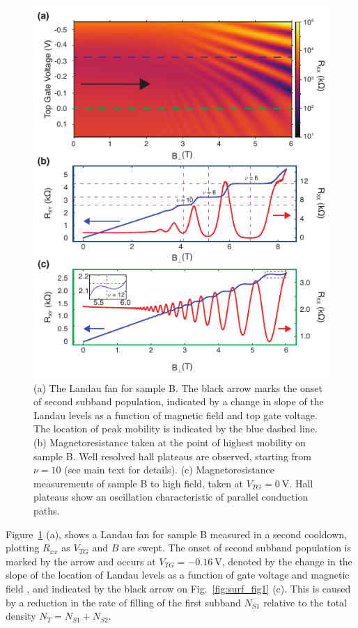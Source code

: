 \begin{figure}
    \includegraphics{Figure2}
    \caption[Magnetoresistance measurements and Landau fan for sample B]{\label{fig:surf_fig2}(a) The Landau fan for sample B. The black arrow marks the onset of second subband population, indicated by a change in slope of the Landau levels as a function of magnetic field and top gate voltage. The location of peak mobility is indicated by the blue dashed line. (b) Magnetoresistance taken at the point of highest mobility on sample B. Well resolved hall plateaus are observed, starting from $\nu = 10$ (see main text for details). (c) Magnetoresistance measurements of sample B to high field, taken at $V_{TG} = \SI{0}{\volt}$. Hall plateaus show an oscillation characteristic of parallel conduction paths. }
\end{figure}

 Figure~\ref{fig:surf_fig2} (a), shows a Landau fan for sample B measured in a second cooldown, plotting $R_{xx}$ as $V_{TG}$ and $B$ are swept.  The onset of second subband population is marked by the arrow and occurs at $V_{TG} = \SI{-0.16}{\volt}$, denoted by the change in the slope of the location of Landau levels as a function of gate voltage and magnetic field \cite{PhysRevB.74.195313,STORMER1982707}, and indicated by the black arrow on Fig.~\ref{fig:surf_fig1} (c). This is caused by a reduction in the rate of filling of the first subband $N_{S1}$ relative to the total density $N_T = N_{S1} + N_{S2}$.

